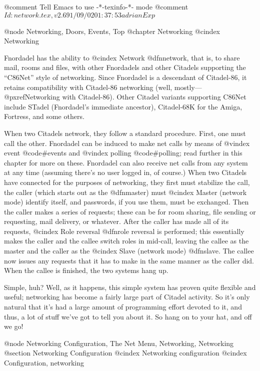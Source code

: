 @comment Tell Emacs to use -*-texinfo-*- mode
@comment $Id: network.tex,v 2.6 91/09/02 01:37:53 adrian Exp $

@node Networking, Doors, Events, Top
@chapter Networking
@cindex Networking

Fnordadel has the ability to
@cindex Network
@dfn{network}, that is, to share mail,
rooms and files, with other Fnordadels and other Citadels supporting
the ``C86Net'' style of networking.  Since Fnordadel is a descendant
of Citadel-86, it retains compatibility with Citadel-86 networking
(well, mostly---@pxref{Networking with Citadel-86}).
Other Citadel variants supporting C86Net
include STadel (Fnordadel's immediate ancestor), Citadel-68K for the
Amiga, Fortress, and some others.

When two Citadels network, they follow a standard procedure.
First, one must call the other.  Fnordadel can be induced to make net
calls by means of
@vindex event
@code{#event}s and
@vindex polling
@code{#polling}; read
further in this chapter for
more on these.  Fnordadel can also receive net calls from any system at
any time (assuming there's no user logged in, of course.)  When two
Citadels have connected for the purposes of networking, they first must
stabilize the call, the caller (which starts out as the
@dfn{master}) must
@cindex Master (network mode)
identify itself, and passwords, if you use them, must be exchanged.  Then the
caller makes a series of requests; these can be for room sharing, file
sending or requesting, mail delivery, or whatever.  After the caller has made
all of its requests,
@cindex Role reversal
@dfn{role reversal} is performed; this essentially makes
the caller and the callee switch roles in mid-call, leaving the callee as
the master and the caller as the
@cindex Slave (network mode)
@dfn{slave}.  The callee now issues any
requests that it has to make in the same manner as the caller did.  When
the callee is finished, the two systems hang up.

Simple, huh?  Well, as it happens, this simple system has proven
quite flexible and useful; networking has become a fairly large part of
Citadel activity.  So it's only natural that it's had a large amount of
programming effort devoted to it, and thus, a lot of stuff we've got to
tell you about it. So hang on to your hat, and off we go!

@node Networking Configuration, The Net Menu, Networking, Networking
@section Networking Configuration
@cindex Networking configuration
@cindex Configuration, networking

